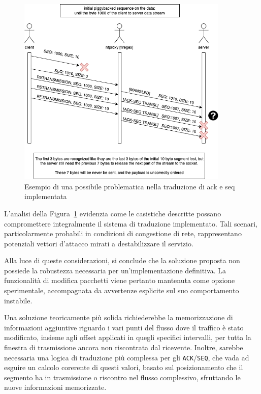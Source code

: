 \begin{figure}[H]
    \centering
    \includegraphics[width=0.90\textwidth]{images/chapter3/TCP_ack_seq_transl_failure.drawio.png}
    \caption{Esempio di una possibile problematica nella traduzione di ack e seq implementata}\label{fig:tcp_ack_seq_transl_failure}
\end{figure}

L'analisi della Figura~\ref{fig:tcp_ack_seq_transl_failure} evidenzia come le casistiche descritte possano compromettere integralmente il sistema di traduzione implementato. Tali scenari, particolarmente probabili in condizioni di congestione di rete, rappresentano potenziali vettori d'attacco mirati a destabilizzare il servizio.

Alla luce di queste considerazioni, si conclude che la soluzione proposta non possiede la robustezza necessaria per un'implementazione definitiva. La funzionalità di modifica pacchetti viene pertanto mantenuta come opzione sperimentale, accompagnata da avvertenze esplicite sul suo comportamento instabile.

Una soluzione teoricamente più solida richiederebbe la memorizzazione di informazioni aggiuntive riguardo i vari punti del flusso dove il traffico è stato modificato, insieme agli offset applicati in quegli specifici intervalli, per tutta la finestra di trasmissione ancora non riscontrata dal ricevente. Inoltre, sarebbe necessaria una logica di traduzione più complessa per gli \texttt{ACK}/\texttt{SEQ}, che vada ad esguire un calcolo corerente di questi valori, basato sul posizionamento che il segmento ha in trasmissione o riscontro nel flusso complessivo, sfruttando le nuove informazioni memorizzate.

